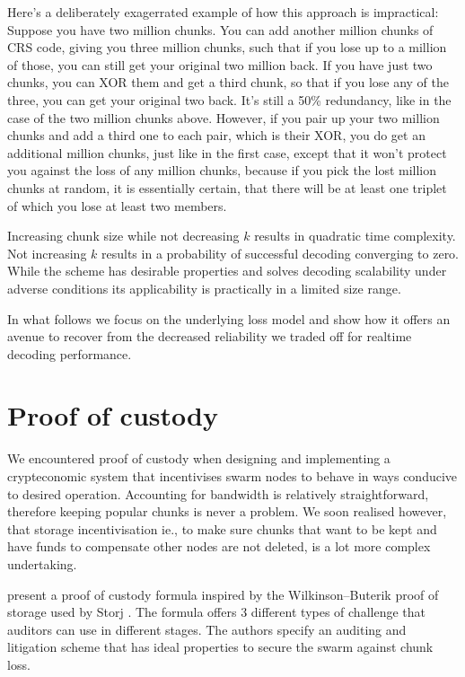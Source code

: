 \documentclass[12pt]{article}
\begin{document}
{Here's a deliberately exagerrated example of how this approach is impractical:
Suppose you have two million chunks. You can add another million chunks of CRS code, giving you three million chunks, such that if you lose up to a million of those, you can still get your original two million back.
If you have just two chunks, you can XOR them and get a third chunk, so that if you lose any of the three, you can get your original two back. It's still a 50\% redundancy, like in the case of the two million chunks above. However, if you pair up your two million chunks and add a third one to each pair, which is their XOR, you do get an additional million chunks, just like in the first case, except that it won't protect you against the loss of any million chunks, because if you pick the lost million chunks at random, it is essentially certain, that there will be at least one triplet of which you lose at least two members.

Increasing chunk size while not decreasing $k$ results in quadratic time complexity. Not increasing $k$ results in a probability of successful decoding converging to zero.
While the scheme has desirable properties and solves decoding scalability under adverse conditions its applicability is practically in a limited size range.

In what follows we focus on the underlying loss model and  show how it offers an avenue to recover from the decreased reliability we  traded off for realtime decoding performance.


\section{Proof of custody}

We encountered proof of custody when designing and implementing a crypteconomic system that incentivises swarm nodes to behave in ways conducive to desired operation.
Accounting for bandwidth is relatively straightforward, therefore keeping popular chunks is never a problem. We soon realised however, that storage incentivisation ie., to make sure chunks that want to be kept and have funds to compensate other nodes are not deleted, is a lot more complex undertaking.

\cite{ethersphere2016smash} present a proof of custody formula inspired by the Wilkinson--Buterik proof of storage used by Storj \cite{wilkinsonetal2014storj}. The formula offers 3 different types of challenge that auditors can use in different stages. The authors specify an auditing and litigation scheme that has ideal properties to secure the swarm against chunk loss.

}
\end{document}
